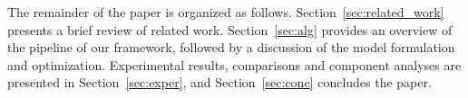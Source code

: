 \documentclass[journal]{IEEEtran}
\begin{document}


The {remainder} of the paper is organized as follows. Section~\ref{sec:related_work} presents a brief review of related work. Section~\ref{sec:alg} provides an overview of the pipeline of our framework, followed by a discussion of the model formulation and optimization. {Experimental} results, comparisons and component analyses are presented in Section~\ref{sec:exper}, and Section~\ref{sec:conc} concludes the paper.
\end{document}
